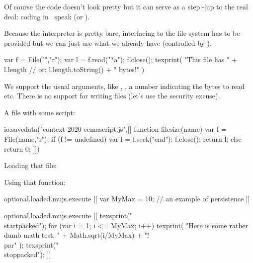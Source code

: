 \typebuffer

\startlinecorrection
\getbuffer
\stoplinecorrection

Of course the code doesn't look pretty but it can serve as a step|-|up to the real
deal: coding in \CONTEXT\ speak (or \LUA).

\stoptitle

\starttitle[title=Files]

Because the interpreter is pretty bare, interfacing to the file system has to be
provided but we can just use what we already have (controlled by \LUA).

\startbuffer
\startecmacode
  var f = File("\jobname","r");
  var l = f.read("*a");
  f.close();
  texprint(
      "This file has "
    + l.length // or: l.length.toString()
    + " bytes!"
  )
\stopecmacode
\stopbuffer

\typebuffer

\getbuffer

We support the usual arguments, like , , a number indicating
the bytes to read etc. There is no support for writing files (let's use the
security excuse).

\page

A file with some script:

\startluacode
io.savedata("context-2020-ecmascript.js",[[
function filesize(name) {
    var f = File(name,"r");
    if (f != undefined) {
        var l = f.seek("end");
        f.close();
        return l;
    } else {
        return 0;
    }
}
]])
\stopluacode


Loading that file:

\startbuffer
{}
\stopbuffer

\typebuffer \getbuffer

Using that function:

\startbuffer
{}
\stopbuffer

\typebuffer \getbuffer

\stoptitle

\starttitle[title=Ecmascript from \LUA]

\startbuffer
\startluacode
  optional.loaded.mujs.execute [[
    var MyMax = 10; // an example of persistence
  ]]

  optional.loaded.mujs.execute [[
    texsprint("\\startpacked");
    for (var i = 1; i <= MyMax; i++) {
      texprint(
        "Here is some rather dumb math test: "
      + Math.sqrt(i/MyMax)
      + "!\\par"
      );
    }
    texsprint("\\stoppacked");
  ]]
\stopluacode
\stopbuffer

